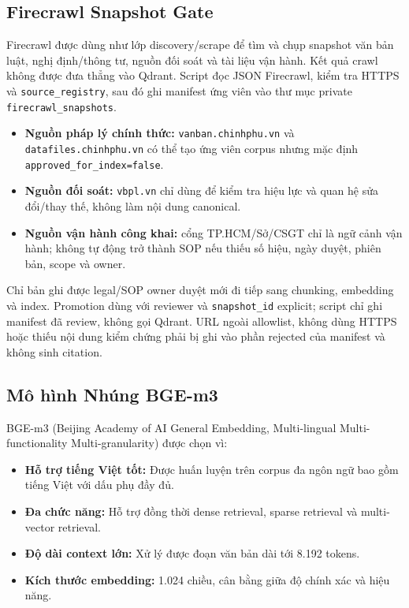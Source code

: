 \subsection{Firecrawl Snapshot Gate}

Firecrawl được dùng như lớp discovery/scrape để tìm và chụp snapshot văn bản luật, nghị định/thông tư, nguồn đối soát và tài liệu vận hành. Kết quả crawl không được đưa thẳng vào Qdrant. Script  đọc JSON Firecrawl, kiểm tra HTTPS và \texttt{source\_registry}, sau đó ghi manifest ứng viên vào thư mục private \texttt{firecrawl\_snapshots}.

\begin{itemize}[itemsep=3pt]
  \item \textbf{Nguồn pháp lý chính thức:} \texttt{vanban.chinhphu.vn} và \texttt{datafiles.chinhphu.vn} có thể tạo ứng viên corpus nhưng mặc định \texttt{approved\_for\_index=false}.
  \item \textbf{Nguồn đối soát:} \texttt{vbpl.vn} chỉ dùng để kiểm tra hiệu lực và quan hệ sửa đổi/thay thế, không làm nội dung canonical.
  \item \textbf{Nguồn vận hành công khai:} cổng TP.HCM/Sở/CSGT chỉ là ngữ cảnh vận hành; không tự động trở thành SOP nếu thiếu số hiệu, ngày duyệt, phiên bản, scope và owner.
\end{itemize}

Chỉ bản ghi được legal/SOP owner duyệt mới đi tiếp sang chunking, embedding và index. Promotion dùng  với reviewer và \texttt{snapshot\_id} explicit; script chỉ ghi manifest đã review, không gọi Qdrant. URL ngoài allowlist, không dùng HTTPS hoặc thiếu nội dung kiểm chứng phải bị ghi vào phần rejected của manifest và không sinh citation.

\subsection{Mô hình Nhúng BGE-m3}

BGE-m3 \cite{chen2023bge} (Beijing Academy of AI General Embedding, Multi-lingual Multi-functionality Multi-granularity) được chọn vì:

\begin{itemize}[itemsep=4pt]
  \item \textbf{Hỗ trợ tiếng Việt tốt:} Được huấn luyện trên corpus đa ngôn ngữ bao gồm tiếng Việt với dấu phụ đầy đủ.
  \item \textbf{Đa chức năng:} Hỗ trợ đồng thời dense retrieval, sparse retrieval và multi-vector retrieval.
  \item \textbf{Độ dài context lớn:} Xử lý được đoạn văn bản dài tới 8.192 tokens.
  \item \textbf{Kích thước embedding:} 1.024 chiều, cân bằng giữa độ chính xác và hiệu năng.
\end{itemize}

